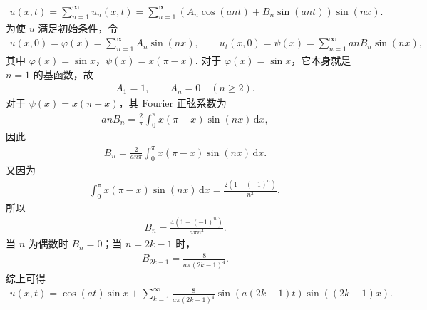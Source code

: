 \documentclass[../../main.tex]{subfiles}%
\begin{document}
\begin{solution}
\begin{enumerate}[(1)]
\begin{align*}
u(x,t)=\sum_{n=1}^{\infty}u_n(x,t)
=\sum_{n=1}^{\infty}\left(A_n\cos(an t)+B_n\sin(an t)\right)\sin(nx).
\end{align*}
为使 $u$ 满足初始条件，令
\begin{align}\label{eq:init1a}
u(x,0)=\varphi(x)=\sum_{n=1}^{\infty}A_n\sin(nx),\qquad
u_t(x,0)=\psi(x)=\sum_{n=1}^{\infty}anB_n\sin(nx),
\end{align}
其中 $\varphi(x)=\sin x$，$\psi(x)=x(\pi-x)$.
对于 $\varphi(x)=\sin x$，它本身就是 $n=1$ 的基函数，故
\begin{align*}
A_1=1,\qquad A_n=0\quad(n\geqslant 2).
\end{align*}
对于 $\psi(x)=x(\pi-x)$，其 Fourier 正弦系数为
\begin{align*}
anB_n=\frac{2}{\pi}\int_0^\pi x(\pi-x)\sin(nx)\,\mathrm{d}x,
\end{align*}
因此
\begin{align*}
B_n=\frac{2}{an\pi}\int_0^\pi x(\pi-x)\sin(nx)\,\mathrm{d}x.
\end{align*}
又因为
\begin{align*}
\int_0^\pi x(\pi-x)\sin(nx)\,\mathrm{d}x = \frac{2(1-(-1)^n)}{n^3},
\end{align*}
所以
\begin{align*}
B_n=\frac{4(1-(-1)^n)}{a\pi n^4}.
\end{align*}
当 $n$ 为偶数时 $B_n=0$；当 $n=2k-1$ 时，
\begin{align*}
B_{2k-1}=\frac{8}{a\pi(2k-1)^4}.
\end{align*}
综上可得
\begin{align*}
u(x,t)=\cos(at)\sin x+\sum_{k=1}^{\infty}\frac{8}{a\pi(2k-1)^4}\sin(a(2k-1)t)\sin((2k-1)x).
\end{align*}


\end{enumerate}
\end{solution}
\end{document}
